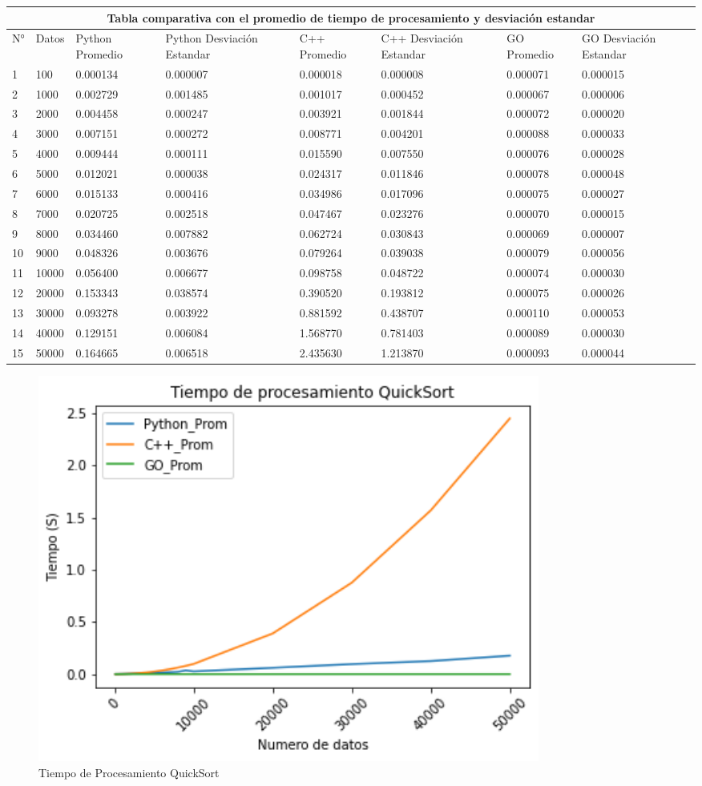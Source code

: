 \documentclass{article}
\begin{document}
\begin{enumerate}
\begin{tabular}{ |p{0.3cm}||p{0.9cm}|p{1.5cm}|p{1.7cm}|p{1.5cm}|p{1.7cm}|p{1.8cm}|p{1.7cm}|  }
 \hline
 \multicolumn{8}{|c|}{Tabla comparativa con el promedio de tiempo de procesamiento y desviación estandar} \\
 \hline
 N°& Datos &Python Promedio &Python Desviación Estandar &C++ Promedio &C++ Desviación Estandar &GO Promedio &GO Desviación Estandar\\
 \hline
 1&100 &0.000134 &0.000007 &0.000018 &0.000008 &0.000071 &0.000015\\
 2&1000 &0.002729 &0.001485 &0.001017 &0.000452 &0.000067 &0.000006\\
 3&2000 &0.004458 &0.000247 &0.003921 &0.001844 &0.000072 &0.000020\\
 4&3000 &0.007151 &0.000272 &0.008771 &0.004201 &0.000088 &0.000033\\
 5&4000 &0.009444 &0.000111 &0.015590 &0.007550 &0.000076 &0.000028\\
 6&5000 &0.012021 &0.000038 &0.024317 &0.011846 &0.000078 &0.000048\\
 7&6000 &0.015133 &0.000416 &0.034986 &0.017096 &0.000075 &0.000027\\
 8&7000 &0.020725 &0.002518 &0.047467 &0.023276 &0.000070 &0.000015\\
 9&8000 &0.034460 &0.007882 &0.062724 &0.030843 &0.000069 &0.000007\\
 10&9000 &0.048326 &0.003676 &0.079264 &0.039038 &0.000079 &0.000056\\
 11&10000 &0.056400 &0.006677 &0.098758 &0.048722 &0.000074 &0.000030\\
 12&20000 &0.153343 &0.038574 &0.390520 &0.193812 &0.000075 &0.000026\\
 13&30000 &0.093278 &0.003922 &0.881592 &0.438707 &0.000110 &0.000053\\
 14&40000 &0.129151 &0.006084 &1.568770 &0.781403 &0.000089 &0.000030\\
 15&50000 &0.164665 &0.006518 &2.435630 &1.213870 &0.000093 &0.000044\\
 \hline
\end{tabular}

\begin{figure}[H]
\centering
\includegraphics[width=0.8\textwidth]{Imagen/TP_QuickSort.png}
\caption{Tiempo de Procesamiento QuickSort}
\label{fig:QuickSort}
\end{figure}


\end{enumerate}
\end{document}
